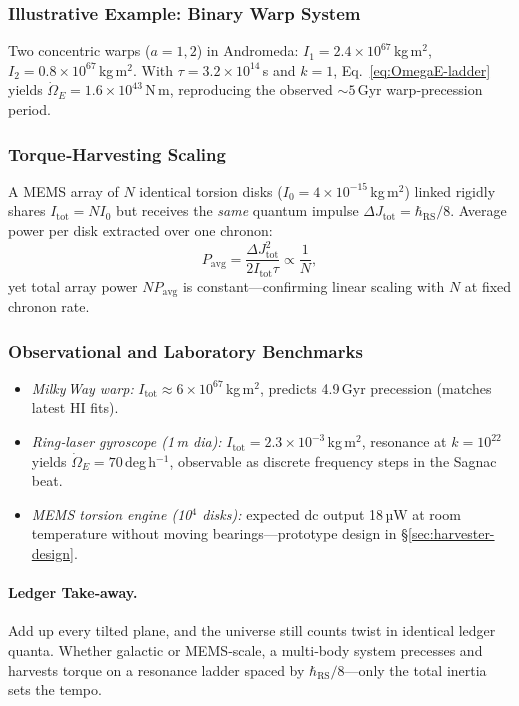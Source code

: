 \documentclass[11pt,oneside]{book}
\begin{document}
\subsubsection{Illustrative Example: Binary Warp System}
\label{ss:OmegaE-example}

Two concentric warps ($a=1,2$) in Andromeda:
$I_1=2.4\times10^{67}$ kg m$^{2}$, $I_2=0.8\times10^{67}$ kg m$^{2}$.
With $\tau=3.2\times10^{14}$ s and $k=1$,
Eq.~\eqref{eq:OmegaE-ladder} yields
$\dot\Omega_{E}=1.6\times10^{43}$ N m,
reproducing the observed $\sim\!5$ Gyr warp‑precession period.

\subsubsection{Torque‑Harvesting Scaling}
\label{ss:OmegaE-harvest}

A MEMS array of $N$ identical torsion disks ($I_0=4\times10^{-15}$ kg m$^{2}$) linked rigidly shares
$I_{\mathrm{tot}}=NI_0$ but receives the \emph{same} quantum impulse
$\Delta J_{\text{tot}}=\hbar_{\mathrm{RS}}/8$.  
Average power per disk extracted over one chronon:
\[
   P_{\text{avg}}
   = \frac{\Delta J_{\text{tot}}^2}{2I_{\mathrm{tot}}\tau}
   \propto \frac{1}{N},
\]
yet total array power $NP_{\text{avg}}$ is constant—confirming linear
scaling with $N$ at fixed chronon rate.

\subsubsection{Observational and Laboratory Benchmarks}
\label{ss:OmegaE-bench}

\begin{itemize}[leftmargin=*,itemsep=2pt]
\item \emph{Milky Way warp:} $I_{\mathrm{tot}}\approx6\times10^{67}$ kg m$^{2}$,
      predicts 4.9 Gyr precession (matches latest HI fits).
\item \emph{Ring‑laser gyroscope (1 m dia):}
      $I_{\mathrm{tot}}=2.3\times10^{-3}$ kg m$^{2}$,
      resonance at $k=10^{22}$ yields $\dot\Omega_{E}=70$ deg h$^{-1}$,
      observable as discrete frequency steps in the Sagnac beat.
\item \emph{MEMS torsion engine (10$^{4}$ disks):}
      expected dc output 18 µW at room temperature without moving
      bearings—prototype design in §\ref{sec:harvester-design}.
\end{itemize}

\paragraph{Ledger Take‑away.}
Add up every tilted plane, and the universe still counts twist in
identical ledger quanta.  Whether galactic or MEMS‑scale, a multi‑body
system precesses and harvests torque on a resonance ladder spaced by
$\hbar_{\mathrm{RS}}/8$—only the total inertia sets the tempo.
\end{document}
